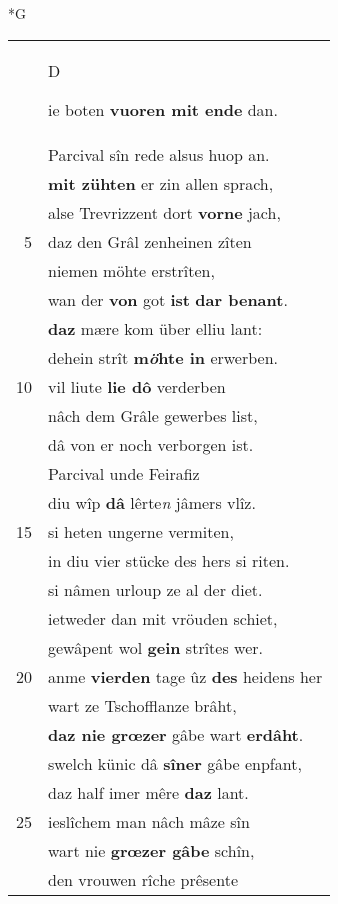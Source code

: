\documentclass[8pt,a4paper,notitlepage]{article}
\begin{document}
\begin{table}[ht]
\begin{minipage}[t]{0.5\linewidth}
\small
\begin{center}*G
\end{center}
\begin{tabular}{rl}
 & \begin{large}D\end{large}ie boten \textbf{vuoren mit ende} dan.\\ 
 & Parcival sîn rede alsus huop an.\\ 
 & \textbf{mit zühten} er zin allen sprach,\\ 
 & alse Trevrizzent dort \textbf{vorne} jach,\\ 
5 & daz den Grâl zenheinen zîten\\ 
 & niemen möhte erstrîten,\\ 
 & wan der \textbf{von} got \textbf{ist} \textbf{dar benant}.\\ 
 & \textbf{daz} mære kom über elliu lant:\\ 
 & dehein strît \textbf{m\textit{ö}hte in} erwerben.\\ 
10 & vil liute \textbf{lie dô} verderben\\ 
 & nâch dem Grâle gewerbes list,\\ 
 & dâ von er noch verborgen ist.\\ 
 & Parcival unde Feirafiz\\ 
 & diu wîp \textbf{dâ} lêrte\textit{n} jâmers vlîz.\\ 
15 & si heten ungerne vermiten,\\ 
 & in diu vier stücke des hers si riten.\\ 
 & si nâmen urloup ze al der diet.\\ 
 & ietweder dan mit vröuden schiet,\\ 
 & gewâpent wol \textbf{gein} strîtes wer.\\ 
20 & anme \textbf{vierden} tage ûz \textbf{des} heidens her\\ 
 & wart ze Tschofflanze brâht,\\ 
 & \textbf{daz nie grœzer} gâbe wart \textbf{erdâht}.\\ 
 & swelch künic dâ \textbf{sîner} gâbe enpfant,\\ 
 & daz half imer mêre \textbf{daz} lant.\\ 
25 & ieslîchem man nâch mâze sîn\\ 
 & wart nie \textbf{grœzer gâbe} schîn,\\ 
 & den vrouwen rîche prêsente\\ 

\end{tabular}
\end{minipage}
\end{table}
\end{document}
